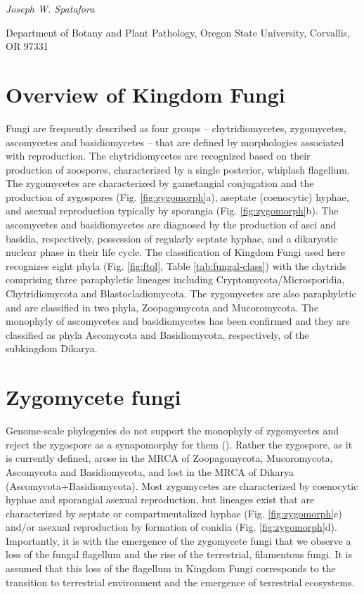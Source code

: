 \documentclass[]{book}
\begin{document}
\emph{Joseph W. Spatafora}

Department of Botany and Plant Pathology, Oregon State University,
Corvallis, OR 97331

\section{Overview of Kingdom Fungi}\label{overview-of-kingdom-fungi}

Fungi are frequently described as four groups -- chytridiomycetes,
zygomycetes, ascomycetes and basidiomycetes -- that are defined by
morphologies associated with reproduction. The chytridiomycetes are
recognized based on their production of zoospores, characterized by a
single posterior, whiplash flagellum. The zygomycetes are characterized
by gametangial conjugation and the production of zygospores (Fig.
\ref{fig:zygomorph}a), aseptate (coenocytic) hyphae, and asexual
reproduction typically by sporangia (Fig. \ref{fig:zygomorph}b). The
ascomycetes and basidiomycetes are diagnosed by the production of asci
and basidia, respectively, possession of regularly septate hyphae, and a
dikaryotic nuclear phase in their life cycle. The classification of
Kingdom Fungi used here recognizes eight phyla (Fig. \ref{fig:ftol},
Table \ref{tab:fungal-class}) with the chytrids comprising three
paraphyletic lineages including Cryptomycota/Microsporidia,
Chytridiomycota and Blastocladiomycota. The zygomycetes are also
paraphyletic and are classified in two phyla, Zoopagomycota and
Mucoromycota. The monophyly of ascomycetes and basidiomycetes has been
confirmed and they are classified as phyla Ascomycota and Basidiomycota,
respectively, of the subkingdom Dikarya.

\section{Zygomycete fungi}\label{zygomycete-fungi}

Genome-scale phylogenies do not support the monophyly of zygomycetes and
reject the zygospore as a synapomorphy for them
(\citet{Spatafora_2016}). Rather the zygospore, as it is currently
defined, arose in the MRCA of Zoopagomycota, Mucoromycota, Ascomycota
and Basidiomycota, and lost in the MRCA of Dikarya
(Ascomycota+Basidiomycota). Most zygomycetes are characterized by
coenocytic hyphae and sporangial asexual reproduction, but lineages
exist that are characterized by septate or compartmentalized hyphae
(Fig. \ref{fig:zygomorph}c) and/or asexual reproduction by formation of
conidia (Fig. \ref{fig:zygomorph}d). Importantly, it is with the
emergence of the zygomycete fungi that we observe a loss of the fungal
flagellum and the rise of the terrestrial, filamentous fungi. It is
assumed that this loss of the flagellum in Kingdom Fungi corresponds to
the transition to terrestrial environment and the emergence of
terrestrial ecosystems.
\end{document}
